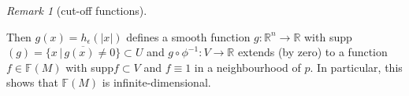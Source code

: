 \documentclass[a4paper,11pt,titlepage, article, oneside]{memoir}
\numberwithin{equation}{section}
\theoremstyle{definition}
\theoremstyle{remark}
\newtheorem{remark}[theorem]{Remark}
\newcommand{\rfield}{\mathbb{R}}
\begin{document}
\begin{remarkbox}
\begin{remark}[cut-off functions]
\begin{figure}[H]
\end{figure}
  Then $g(x) = h_{\epsilon}(|x|)$ defines a smooth function $g \colon \rfield^n \rightarrow \rfield$ with supp$(g) = \overline{\{ x \, | \, g(x) \not =  0\}} \subset U$ and $g \circ \phi^{-1} \colon V \rightarrow \rfield$ extends (by zero) to a function $f \in \mathbb{F}(M)$ with supp$f \subset V$ and $f \equiv 1$ in a neighbourhood of $p$. In particular, this shows that $\mathbb{F}(M)$ is infinite-dimensional.


\end{remark}
\end{remarkbox}
\end{document}
